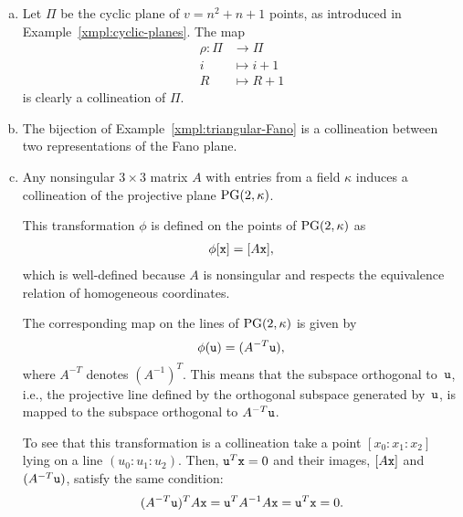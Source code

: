 \begin{xmpls}\label{xmpl:a-cyclic-collineation}${}$
    \begin{enumerate}[a),font=\upshape]
        \item Let $\Pi$ be the cyclic plane of $v=n^2+n+1$ points, as introduced in Example~\ref{xmpl:cyclic-planes}. The map
        \begin{align*}
            \rho\colon\Pi&\to\Pi\\
            i&\mapsto i+1\\
            R&\mapsto R+1
        \end{align*}
        is clearly a collineation of $\Pi$.

        \item The bijection of Example~\ref{xmpl:triangular-Fano} is a collineation between two representations of the Fano plane.

        \item Any nonsingular\/ $3 \times 3$ matrix\/ $A$ with entries from a field\/ $\kappa$ induces a collineation of the projective plane\/ $\operatorname{PG}(2,\kappa)$.

        This transformation\/ $\phi$ is defined on the points of\/ $\operatorname{PG}(2,\kappa)$ as
        \begin{align*}
            \phi[\mathtt x]=[A\mathtt x],
        \end{align*}
        which is well-defined because $A$ is nonsingular and respects the equivalence relation of homogeneous coordinates.
        
        The corresponding map on the lines of $\operatorname{PG}(2,\kappa)$ is given by
        \[
            \phi(\mathtt u)=(A^{-T}\mathtt u),
        \]
        where $A^{-T}$ denotes $(A^{-1})^T$. This means that the subspace orthogonal to~$\mathtt u$, i.e., the projective line defined by the orthogonal subspace generated by~$\mathtt u$, is mapped to the subspace orthogonal to $A^{-T}\mathtt u$.
        
        To see that this transformation is a collineation take a point $[x_0:x_1:x_2]$ lying on a line $(u_0:u_1:u_2)$. Then, $\mathtt u^T\mathtt x=0$ and their images, $[A\mathtt x]$ and $(A^{-T}\mathtt u)$, satisfy the same condition:
        \[
            (A^{-T}\mathtt u)^TA\mathtt x
                = \mathtt u^T A^{-1}A\mathtt x
                = \mathtt u^T\mathtt x = 0.
        \]
    \end{enumerate}
\end{xmpls}

